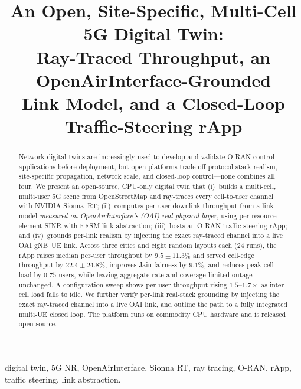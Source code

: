 \documentclass[conference]{IEEEtran}
\begin{document}
\title{An Open, Site-Specific, Multi-Cell 5G Digital Twin:\\
Ray-Traced Throughput, an OpenAirInterface-Grounded\\
Link Model, and a Closed-Loop Traffic-Steering rApp}

\author{
}

\maketitle

\begin{abstract}
Network digital twins are increasingly used to develop and validate O-RAN control
applications before deployment, but open platforms trade off protocol-stack
realism, site-specific propagation, network scale, and closed-loop control---none
combines all four. We present an open-source, CPU-only digital twin that (i)~builds
a multi-cell, multi-user 5G scene from OpenStreetMap and ray-traces every
cell-to-user channel with NVIDIA Sionna~RT; (ii)~computes per-user downlink
throughput from a link model \emph{measured on OpenAirInterface's (OAI) real
physical layer}, using per-resource-element SINR with EESM link abstraction;
(iii)~hosts an O-RAN traffic-steering rApp; and (iv)~grounds per-link realism by
injecting the exact ray-traced channel into a live OAI gNB--UE link. Across three
cities and eight random layouts each (24 runs), the rApp raises median per-user
throughput by $9.5\pm11.3\%$ and served cell-edge throughput by $22.4\pm24.8\%$,
improves Jain fairness by $9.1\%$, and reduces peak cell load by $0.75$ users,
while leaving aggregate rate and coverage-limited outage unchanged. A configuration
sweep shows per-user throughput rising $1.5$--$1.7\times$ as inter-cell load falls
to idle. We further verify per-link real-stack grounding by injecting the exact
ray-traced channel into a live OAI link, and outline the path to a fully integrated
multi-UE closed loop. The platform runs on commodity CPU hardware and is released
open-source.
\end{abstract}

\begin{IEEEkeywords}
digital twin, 5G NR, OpenAirInterface, Sionna RT, ray tracing, O-RAN, rApp,
traffic steering, link abstraction.
\end{IEEEkeywords}
\end{document}
